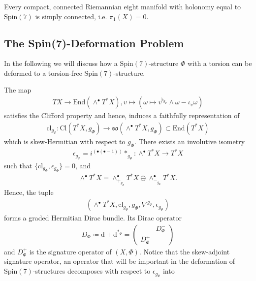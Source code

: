 \documentclass[psamsfonts]{amsart}
\theoremstyle{plain}
\theoremstyle{definition}{
\newtheorem{defi}{Definition}[section]
\newtheorem{ass}{Assumption}
\newtheorem*{nota}{Notation}}
\theoremstyle{remark}{
\newtheorem{rem}{Remark}
\newtheorem{ex}{Example}}
\theoremstyle{plain}{
\newtheorem{thm}{Theorem}[section]
\newtheorem{lem}{Lemma}[section]
\newtheorem{cor}{Corollary}[section]
\newtheorem{prop}{Proposition}[section]
\newtheorem{con}{Conjecture}[section]}
\newcommand{\m}[1]{{\mathrm{#1}}}
\begin{document}
\begin{cor}
Every compact, connected Riemannian eight manifold with holonomy equal to $\m{Spin}(7)$ is simply connected, i.e. $\pi_1(X)=0$.
\end{cor}


\subsection{The Spin(7)-Deformation Problem}
\label{The Spin(7)-Deformation Problem}


In the following we will discuss how a $\m{Spin}(7)$-structure $\Phi$ with a  torsion can be deformed to a torsion-free $\m{Spin}(7)$-structure.

The map 
\begin{align*}
    TX\rightarrow \m{End}(\wedge^\bullet T^*X),v\mapsto\left(\omega\mapsto v^{\flat_{g_\Phi}}\wedge\omega-\iota_{v}\omega\right) 
\end{align*}
satisfies the Clifford property and hence, induces a faithfully representation of
\begin{align*}
    \m{cl}_{g_{\Phi}} \colon\m{Cl}(T^*X,g_{\Phi})\rightarrow\mathfrak{so}(\wedge^\bullet T^*X,g_{\Phi})\subset\m{End}(T^*X)
\end{align*}
which is skew-Hermitian with respect to $g_{\Phi}$. There exists an involutive isometry
\begin{align*}
    \epsilon_{g_{\Phi}}=i^{(\bullet(\bullet-1))}*_{g_{\Phi}} \colon\wedge^\bullet T^*X\rightarrow T^*X
\end{align*}
such that $\{\m{cl}_{g_{\Phi}},\epsilon_{g_{\Phi}}\}=0$, and 
\begin{align*}
    \wedge^\bullet T^*X=\wedge^\bullet_{+_{g_{\Phi}}}T^*X\oplus \wedge^\bullet_{-_{g_{\Phi}}}T^*X.
\end{align*}
Hence, the tuple 
\begin{align*}
    (\wedge^\bullet T^*X,\m{cl}_{g_{\Phi}},g_{\Phi},\nabla^{g_{\Phi}},\epsilon_{g_{\Phi}})
\end{align*}
forms a graded Hermitian Dirac bundle. Its Dirac operator 
\begin{align*}
    D_{\Phi}\coloneqq\m{d}+\m{d}^{*_{\Phi}}=\left(\begin{array}{cc}
         &D^-_{\Phi}  \\
         D_{\Phi}^+& 
    \end{array}\right)
\end{align*}
and $D^+_{\Phi}$ is the signature operator of $(X,\Phi)$. Notice that the skew-adjoint  signature operator, an operator that will be important in the deformation of $\m{Spin}(7)$-structures decomposes with respect to $\epsilon_{g_{\Phi}}$ into
\end{document}
